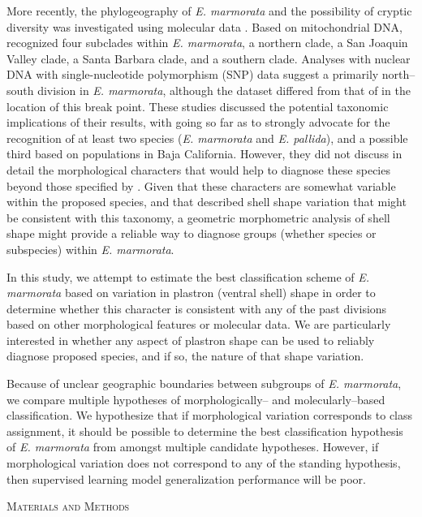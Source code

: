 \documentclass[12pt,letterpaper]{article}
\renewcommand{\section}[1]{%
\bigskip
\begin{center}
\begin{Large}
\normalfont\scshape #1
\medskip
\end{Large}
\end{center}}
\begin{document}
More recently, the phylogeography of \textit{E. marmorata} and the possibility of cryptic diversity was investigated using molecular data \citep{Spinks2005,Spinks2010,Spinks2014}. Based on mitochondrial DNA, \citet{Spinks2005} recognized four subclades within \textit{E. marmorata}, a northern clade, a San Joaquin Valley clade, a Santa Barbara clade, and a southern clade. Analyses with nuclear DNA \citep{Spinks2010} with single-nucleotide polymorphism (SNP) data suggest a primarily north--south division in \textit{E. marmorata}, although the dataset differed from that of \citet{Spinks2005} in the location of this break point. These studies discussed the potential taxonomic implications of their results, with \citet{Spinks2014} going so far as to strongly advocate for the recognition of at least two species (\emph{E. marmorata} and \emph{E. pallida}), and a possible third based on populations in Baja California. However, they did not discuss in detail the morphological characters that would help to diagnose these species beyond those specified by \citet{Seeliger1945}. Given that these characters are somewhat variable within the proposed species, and that \citet{Holland1992} described shell shape variation that might be consistent with this taxonomy, a geometric morphometric analysis of shell shape might provide a reliable way to diagnose groups (whether species or subspecies) within \textit{E. marmorata}.

In this study, we attempt to estimate the best classification scheme of \textit{E. marmorata} based on variation in plastron (ventral shell) shape in order to determine whether this character is consistent with any of the past divisions based on other morphological features or molecular data. We are particularly interested in whether any aspect of plastron shape can be used to reliably diagnose \citet{Spinks2014} proposed species, and if so, the nature of that shape variation.

Because of unclear geographic boundaries between subgroups of \textit{E. marmorata}, we compare multiple hypotheses of morphologically-- and molecularly--based classification. We hypothesize that if morphological variation corresponds to class assignment, it should be possible to determine the best classification hypothesis of \textit{E. marmorata} from amongst multiple candidate hypotheses. However, if morphological variation does not correspond to any of the standing hypothesis, then supervised learning model generalization performance will be poor.


\section{Materials and Methods}
\end{document}
